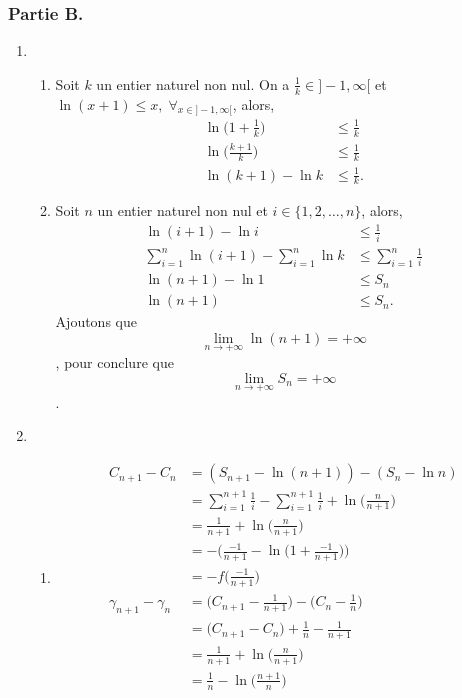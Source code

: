 \documentclass{article}
\begin{document}
	\subsubsection*{Partie B.}
	\begin{enumerate}
		\item \begin{enumerate}[label=(\alph*)]
			\item Soit $k$ un entier naturel non nul. On a $\frac{1}{k}\in]-1,\infty[$ et $\ln(x+1)\leq x, \; \forall_{x\in]-1,\infty[}$, alors,
			\begin{align*}
				\ln\Big(1+\frac{1}{k}\Big)&\leq\frac{1}{k}\\
				\ln\Big(\frac{k+1}{k}\Big)&\leq\frac{1}{k}\\
				\ln(k+1)-\ln k&\leq\frac{1}{k}.
			\end{align*}
			\item Soit $n$ un entier naturel non nul et $i\in\{1,2,\ldots,n\}$, alors,
			\begin{align*}
			\ln(i+1)-\ln i&\leq\frac{1}{i}\\
			\sum_{i=1}^{n}\ln(i+1)-\sum_{i=1}^{n}\ln k&\leq\sum_{i=1}^{n}\frac{1}{i}\\
			\ln(n+1)-\ln1&\leq S_n\\
			\ln(n+1)&\leq S_n.
			\end{align*}
			Ajoutons que $$ \lim_{n\to+\infty}\ln(n+1)=+\infty$$, pour conclure que $$\lim_{n\to+\infty}S_n=+\infty$$.
		\end{enumerate}
		\item \begin{enumerate}[label=(\alph*)]
			\item \begin{align*}
				C_{n+1}-C_n & =(S_{n+1}-\ln(n+1))-(S_n-\ln n)\\
				&=\sum_{i=1}^{n+1}\frac{1}{i}-\sum_{i=1}^{n+1}\frac{1}{i}+\ln\Big(\frac{n}{n+1}\Big)\\		&=\frac{1}{n+1}+\ln\Big(\frac{n}{n+1}\Big)\\
				&=-\Bigg(\frac{-1}{n+1}-\ln\Big(1+\frac{-1}{n+1}\Big)\Bigg)\\
				&=-f\Big(\frac{-1}{n+1}\Big)\\
				\gamma_{n+1}-\gamma_n&=\Big(C_{n+1}-\frac{1}{n+1}\Big)-\Big(C_n-\frac{1}{n}\Big)\\
				&=\Big(C_{n+1}-C_n\Big)+\frac{1}{n}-\frac{1}{n+1}\\
				&=\frac{1}{n+1}+\ln\Big(\frac{n}{n+1}\Big)\\
				&=\frac{1}{n}-\ln\Big(\frac{n+1}{n}\Big)\\

\end{align*}
\end{enumerate}
\end{enumerate}
\end{document}
